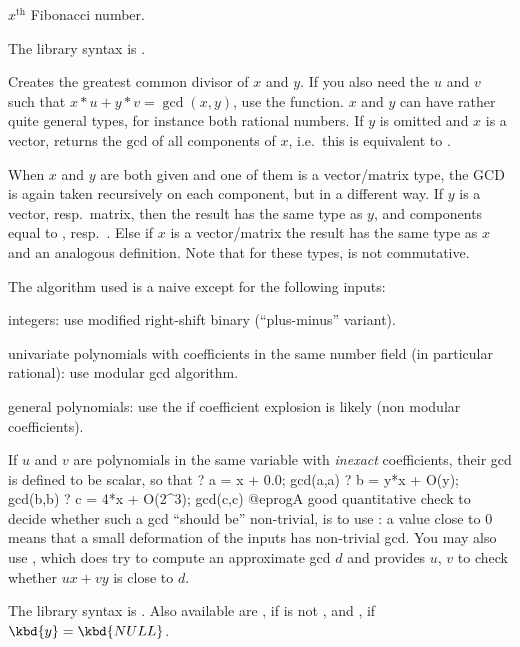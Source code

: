 \label{se:fibonacci}
$x^{\text{th}}$ Fibonacci number.

The library syntax is .

\label{se:gcd}
Creates the greatest common divisor of $x$ and $y$.
If you also need the $u$ and $v$ such that $x*u + y*v = \gcd(x,y)$,
use the  function. $x$ and $y$ can have rather quite general
types, for instance both rational numbers. If $y$ is omitted and $x$ is a
vector, returns the $\text{gcd}$ of all components of $x$, i.e.~this is
equivalent to .

When $x$ and $y$ are both given and one of them is a vector/matrix type,
the GCD is again taken recursively on each component, but in a different way.
If $y$ is a vector, resp.~matrix, then the result has the same type as $y$,
and components equal to , resp.~. Else
if $x$ is a vector/matrix the result has the same type as $x$ and an
analogous definition. Note that for these types,  is not
commutative.

The algorithm used is a naive  except for the following inputs:

\item integers: use modified right-shift binary (``plus-minus''
variant).

\item univariate polynomials with coefficients in the same number
field (in particular rational): use modular gcd algorithm.

\item general polynomials: use the  if
coefficient explosion is likely (non modular coefficients).

If $u$ and $v$ are polynomials in the same variable with \emph{inexact}
coefficients, their gcd is defined to be scalar, so that
\bprog
? a = x + 0.0; gcd(a,a)
? b = y*x + O(y); gcd(b,b)
? c = 4*x + O(2^3); gcd(c,c)
@eprog\noindent A good quantitative check to decide whether such a
gcd ``should be'' non-trivial, is to use : a value
close to $0$ means that a small deformation of the inputs has non-trivial gcd.
You may also use , which does try to compute an approximate gcd
$d$ and provides $u$, $v$ to check whether $u x + v y$ is close to $d$.

The library syntax is .
Also available are , if  is not
, and , if $\kbd{y} = \kbd{NULL}$.

